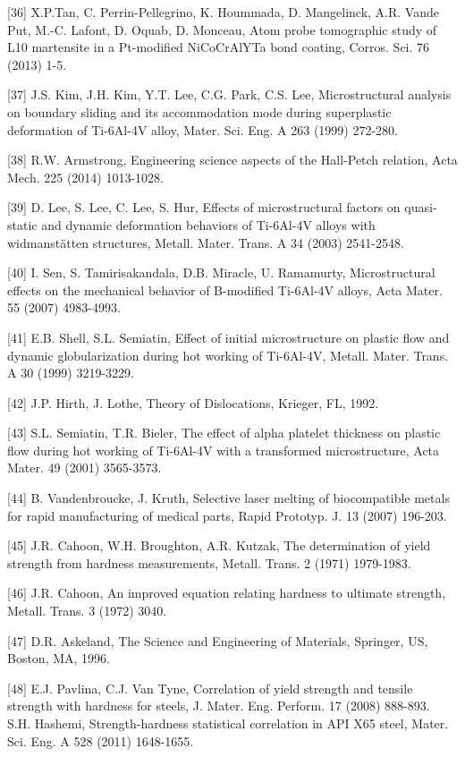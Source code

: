 \documentclass[10pt]{article}
\begin{document}
[36] X.P.Tan, C. Perrin-Pellegrino, K. Hoummada, D. Mangelinck, A.R. Vande Put, M.-C. Lafont, D. Oquab, D. Monceau, Atom probe tomographic study of L10 martensite in a Pt-modified NiCoCrAlYTa bond coating, Corros. Sci. 76 (2013) 1-5.

[37] J.S. Kim, J.H. Kim, Y.T. Lee, C.G. Park, C.S. Lee, Microstructural analysis on boundary sliding and its accommodation mode during superplastic deformation of Ti-6Al-4V alloy, Mater. Sci. Eng. A 263 (1999) 272-280.

[38] R.W. Armstrong, Engineering science aspects of the Hall-Petch relation, Acta Mech. 225 (2014) 1013-1028.

[39] D. Lee, S. Lee, C. Lee, S. Hur, Effects of microstructural factors on quasi-static and dynamic deformation behaviors of Ti-6Al-4V alloys with widmanstätten structures, Metall. Mater. Trans. A 34 (2003) 2541-2548.

[40] I. Sen, S. Tamirisakandala, D.B. Miracle, U. Ramamurty, Microstructural effects on the mechanical behavior of B-modified Ti-6Al-4V alloys, Acta Mater. 55 (2007) 4983-4993.

[41] E.B. Shell, S.L. Semiatin, Effect of initial microstructure on plastic flow and dynamic globularization during hot working of Ti-6Al-4V, Metall. Mater. Trans. A 30 (1999) 3219-3229.

[42] J.P. Hirth, J. Lothe, Theory of Dislocations, Krieger, FL, 1992.

[43] S.L. Semiatin, T.R. Bieler, The effect of alpha platelet thickness on plastic flow during hot working of Ti-6Al-4V with a transformed microstructure, Acta Mater. 49 (2001) 3565-3573.

[44] B. Vandenbroucke, J. Kruth, Selective laser melting of biocompatible metals for rapid manufacturing of medical parts, Rapid Prototyp. J. 13 (2007) 196-203.

[45] J.R. Cahoon, W.H. Broughton, A.R. Kutzak, The determination of yield strength from hardness measurements, Metall. Trans. 2 (1971) 1979-1983.

[46] J.R. Cahoon, An improved equation relating hardness to ultimate strength, Metall. Trans. 3 (1972) 3040.

[47] D.R. Askeland, The Science and Engineering of Materials, Springer, US, Boston, MA, 1996.

[48] E.J. Pavlina, C.J. Van Tyne, Correlation of yield strength and tensile strength with hardness for steels, J. Mater. Eng. Perform. 17 (2008) 888-893.\\
[49] S.H. Hashemi, Strength-hardness statistical correlation in API X65 steel, Mater. Sci. Eng. A 528 (2011) 1648-1655.
\end{document}
